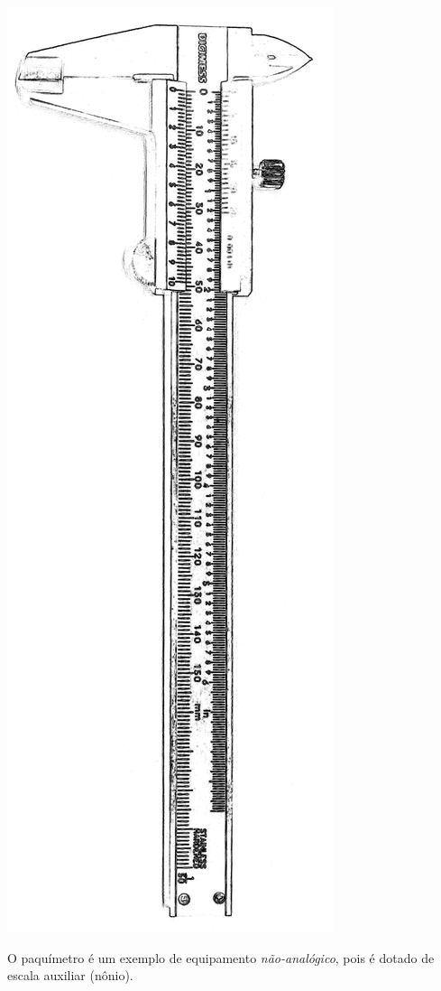 \begin{marginfigure}[1cm]
	\includegraphics[width=\textwidth]{Ilustrations/Paquimetro_vert.png}
	\caption{O paquímetro é um exemplo de equipamento \emph{não-analógico}, pois é dotado de escala auxiliar (nônio).}
\end{marginfigure}


